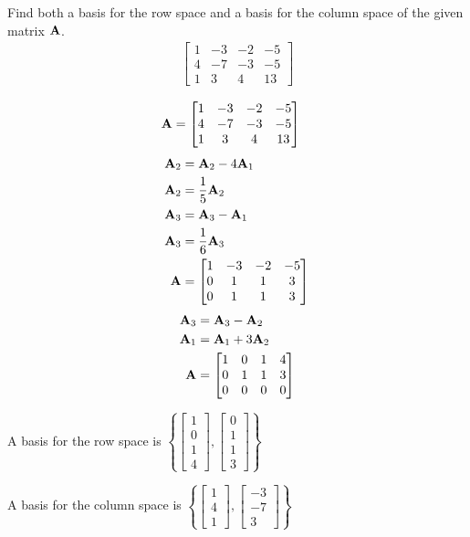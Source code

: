 \documentclass{article}
\begin{document}
Find both a basis for the row space and a basis for the column space of the given matrix $ \mathbf{A} $.
\begin{align*}
	\begin{bmatrix}
		1 & -3 & -2 & -5 \\
		4 & -7 & -3 & -5 \\
		1 & 3 & 4 & 13
	\end{bmatrix}
\end{align*}

\begin{align*}
	\mathbf{A} & =
		\begin{bmatrix}
			1 & -3 & -2 & -5 \\
			4 & -7 & -3 & -5 \\
			1 & 3 & 4 & 13
		\end{bmatrix}
\end{align*}
\begin{align*}
	\mathbf{A}_2 & = \mathbf{A}_2 - 4\mathbf{A}_1 \\
	\mathbf{A}_2 & = \frac{1}{5}\mathbf{A}_2 \\
	\mathbf{A}_3 & = \mathbf{A}_3 - \mathbf{A}_1 \\
	\mathbf{A}_3 & = \frac{1}{6}\mathbf{A}_3 \\
	\mathbf{A} & =
		\begin{bmatrix}
			1 & -3 & -2 & -5 \\
			0 & 1 & 1 & 3 \\
			0 & 1 & 1 & 3
		\end{bmatrix}
\end{align*}
\begin{align*}
	\mathbf{A}_3 & = \mathbf{A}_3 - \mathbf{A}_2 \\
	\mathbf{A}_1 & = \mathbf{A}_1 + 3\mathbf{A}_2 \\
	\mathbf{A} & =
		\begin{bmatrix}
			1 & 0 & 1 & 4 \\
			0 & 1 & 1 & 3 \\
			0 & 0 & 0 & 0
		\end{bmatrix}
\end{align*}
\begin{mdframed}
	A basis for the row space is
	$ \left\{
		\begin{bmatrix} 1 \\ 0 \\ 1 \\ 4 \end{bmatrix},
		\begin{bmatrix} 0 \\ 1 \\ 1 \\ 3 \end{bmatrix}
	\right\} $
	
	A basis for the column space is
	$ \left\{
		\begin{bmatrix} 1 \\ 4 \\ 1 \end{bmatrix},
		\begin{bmatrix} -3 \\ -7 \\ 3 \end{bmatrix}
	\right\} $
\end{mdframed}
\end{document}
